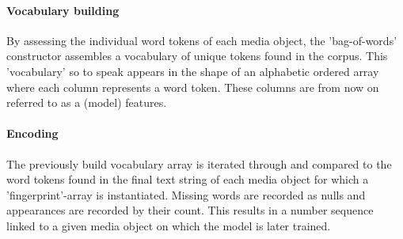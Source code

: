 \paragraph{Vocabulary building} By assessing the individual word tokens of each media object, the 'bag-of-words' constructor assembles a vocabulary of unique tokens found in the corpus. This 'vocabulary' so to speak appears in the shape of an alphabetic ordered array where each column represents a word token. These columns are from now on referred to as a (model) features.

\paragraph{Encoding} The previously build vocabulary array is iterated through and compared to the word tokens found in the final text string of each media object for which a 'fingerprint'-array is instantiated. Missing words are recorded as nulls and appearances are recorded by their count. This results in a number sequence linked to a given media object on which the model is later trained.

